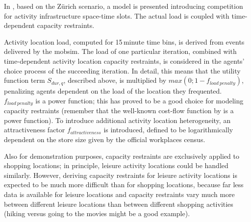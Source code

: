 In \citet[][]{HorniEtAl_TRR_2009}, based on the Zürich scenario, a 
model is presented introducing competition for activity infrastructure space-time slots. 
The actual load is coupled with time-dependent capacity restraints.

Activity location load, computed for 15\,minute time bins, is derived from events delivered by the \gls{mobsim}. 
The load of one particular iteration, combined with time-dependent activity location capacity restraints, is considered in the agents' choice process of the succeeding iteration. 
In detail, this means that the utility function term $S_{dur,q}$, described above, is multiplied by $max(0; 1 - f_{load\ penalty})$, penalizing agents dependent on the load of the location they frequented. 
$f_{load\ penalty}$ is a power function; this has proved to be a good choice for modeling capacity restraints (remember that the well-known cost-flow function by \citet[][]{TA_manual_1964} is a power function). 
To introduce additional activity location heterogeneity, an attractiveness factor $f_{attractiveness}$ is introduced, defined to be logarithmically dependent on the store size given by the official workplaces census.

Also for demonstration purposes, capacity restraints are exclusively applied to shopping locations; in principle, leisure activity locations could be handled similarly. However, deriving capacity restraints for leisure activity locations is expected to be much more difficult than for shopping locations, because far less data is available for leisure locations and capacity restraints vary much more between different leisure locations than between different shopping activities (hiking versus going to the movies might be a good example).

